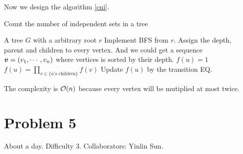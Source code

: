 \documentclass{article}
\begin{document}
Now we design the algorithm \ref{cni}.
\begin{algorithm}[htbp]
	\caption{Count the number of independent sets in a tree}
	\label{cni}
	\begin{algorithmic}[1]
		\renewcommand{\algorithmicrequire}{\textbf{Input:}}
		\renewcommand{\algorithmicensure}{\textbf{Output:}}
		\renewcommand{\algorithmiccomment}[1]{\hfill\textit{\textcolor{blue}{\##1}}}
		\REQUIRE A tree $G$ with a arbitrary root $r$
		\STATE Implement BFS from $r$. Assign the depth, parent and children to every vertex. And we could get a sequence $\boldsymbol{v}=(v_1,\cdots,v_n)$ where vertices is sorted by their depth.
		\STATE $f(u)=1$
		\STATE $f(u)=\prod_{v\in\{u\text{'s children}\}} f(v)$
		\ELSE
		\STATE Update $f(u)$ by the transition EQ.
		\ENDIF
		\ENDFOR
		\RETURN 
	\end{algorithmic} 
\end{algorithm}

The complexity is $\mathcal{O}(n)$ because every vertex will be mutiplied at most twice.

\section*{Problem 5}
About a day.
Difficulty 3.
Collaborators: Yinlin Sun.
\end{document}
